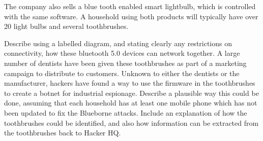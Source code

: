 \documentclass[9pt, addpoints]{exam}
\begin{document}
\begin{questions}
\begin{parts}
\begin{subparts}
\subpart[4] The company also sells a blue tooth enabled smart lightbulb, which is controlled
with the same software. A household using both products will typically have
over 20 light bulbs and several toothbrushes.

Describe using a labelled diagram, and stating clearly any restrictions on connectivity,
how these bluetooth 5.0 devices can network together.
\subpart[4] A large number of dentists have been given these toothbrushes as part of a marketing campaign to
distribute to customers. Unknown to either the dentists or the manufacturer, hackers have
found a way to use the firmware in the toothbrushes to create a botnet for industrial espionage. Describe a
plausible way this could be done, assuming that each household has at least
one mobile phone which has not been updated to fix the Blueborne attacks.
Include an explanation of how the toothbrushes could be identified, and also how
information can be extracted from the toothbrushes back to Hacker HQ.
\end{subparts}

\end{parts}

\end{questions}
\end{document}
